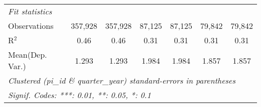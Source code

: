 \begin{tabular}{lcccccc}
   \midrule
   \emph{Fit statistics}\\
   Observations                                                & 357,928       & 357,928       & 87,125        & 87,125        & 79,842        & 79,842\\  
   R$^2$                                                       & 0.46          & 0.46          & 0.31          & 0.31          & 0.31          & 0.31\\  
Mean(Dep. Var.) & 1.293 & 1.293 & 1.984 & 1.984 & 1.857 & 1.857 \\
   \midrule \midrule
   \multicolumn{7}{l}{\emph{Clustered (pi\_id \& quarter\_year) standard-errors in parentheses}}\\
   \multicolumn{7}{l}{\emph{Signif. Codes: ***: 0.01, **: 0.05, *: 0.1}}\\
\end{tabular}
\par\endgroup
